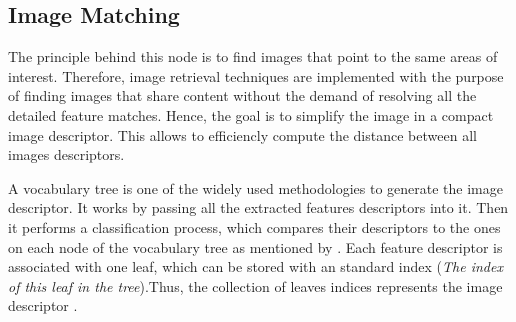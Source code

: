 \documentclass[12pt]{report}
\begin{document}
\begin{table}[h!]
  \centering
  \caption{Meshroom FeatureExtraction Node Settings}
  \label{tab:FeatureExtraction}
  \end{table}

  
\subsection{Image Matching}
The principle behind this node is to find images that point to the same areas of interest. Therefore, image retrieval techniques are implemented with the purpose of finding images 
that share content without the demand of resolving all the  detailed feature matches. Hence, the goal is to simplify the image in a compact image descriptor. This allows to efficiencly compute the distance between all images descriptors.

A vocabulary tree is one of the widely used methodologies to generate the image descriptor. It works by passing all the extracted features descriptors into it. Then it performs a classification process, which compares their descriptors to the ones on each node of the vocabulary tree as mentioned by .
Each feature descriptor is associated with one leaf, which can be stored with an standard index (\textit{The index of this leaf in the tree}).Thus, the collection of leaves indices represents the image descriptor .
\end{document}
